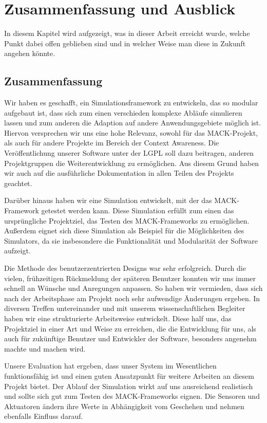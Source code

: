 \chapter{Zusammenfassung und Ausblick}\label{chapter:conclusions}
In diesem Kapitel wird aufgezeigt, was in dieser Arbeit erreicht wurde, welche Punkt dabei offen geblieben sind und in welcher Weise man diese in Zukunft angehen könnte.
\section{Zusammenfassung}\label{sec:conc_summary}
Wir haben es geschafft, ein Simulationsframework zu entwickeln, das so modular aufgebaut ist, dass sich zum einen verschieden komplexe Abläufe simulieren lassen und zum anderen die Adaption auf andere Anwendungsgebiete möglich ist. Hiervon versprechen wir uns eine hohe Relevanz, sowohl für das MACK-Projekt, als auch für andere Projekte im Bereich der Context Awareness. Die Veröffentlichung unserer Software unter der LGPL soll dazu beitragen, anderen Projektgruppen die Weiterentwicklung zu ermöglichen. Aus diesem Grund haben wir auch auf die ausführliche Dokumentation in allen Teilen des Projekts geachtet.

Darüber hinaus haben wir eine Simulation entwickelt, mit der das MACK-Framework getestet werden kann. Diese Simulation erfüllt zum einen das ursprüngliche Projektziel, das Testen des MACK-Frameworks zu ermöglichen. Außerdem eignet sich diese Simulation als Beispiel für die Möglichkeiten des Simulators, da sie insbesondere die Funktionalität und Modularität der Software aufzeigt.

Die Methode des benutzerzentrierten Designs war sehr erfolgreich. Durch die vielen, frühzeitigen Rückmeldung der späteren Benutzer konnten wir uns immer schnell an Wünsche und Anregungen anpassen. So haben wir vermieden, dass sich nach der Arbeitsphase am Projekt noch sehr aufwendige Änderungen ergeben. 
In diversen Treffen untereinander und mit unserem wissenschaftlichen Begleiter haben wir eine strukturierte Arbeitsweise entwickelt. Diese half uns, das Projektziel in einer Art und Weise zu erreichen, die die Entwicklung für uns, als auch für zukünftige Benutzer und Entwickler der Software, besonders angenehm machte und machen wird.

Unsere Evaluation hat ergeben, dass unser System im Wesentlichen funktionsfähig ist und einen guten Ansatzpunkt für weitere Arbeiten an diesem Projekt bietet. Der Ablauf der Simulation wirkt auf uns ausreichend realistisch und sollte sich gut zum Testen des MACK-Frameworks eignen. Die Sensoren und Aktuatoren ändern ihre Werte in Abhängigkeit vom Geschehen und nehmen ebenfalls Einfluss darauf.

